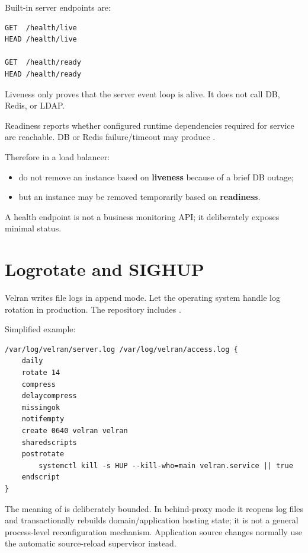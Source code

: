 Built-in server endpoints are:

\begin{lstlisting}
GET  /health/live
HEAD /health/live

GET  /health/ready
HEAD /health/ready
\end{lstlisting}

Liveness only proves that the server event loop is alive. It does not call DB, Redis, or LDAP.

Readiness reports whether configured runtime dependencies required for service are reachable. DB or Redis failure/timeout may produce .

Therefore in a load balancer:

\begin{itemize}
  \item do not remove an instance based on \textbf{liveness} because of a brief DB outage;
  \item but an instance may be removed temporarily based on \textbf{readiness}.
\end{itemize}

A health endpoint is not a business monitoring API; it deliberately exposes minimal status.

\Needspace{0.46\textheight}
\section{Logrotate and SIGHUP}

Velran writes file logs in append mode. Let the operating system handle log rotation in production. The repository includes .

Simplified example:

\begin{lstlisting}
/var/log/velran/server.log /var/log/velran/access.log {
    daily
    rotate 14
    compress
    delaycompress
    missingok
    notifempty
    create 0640 velran velran
    sharedscripts
    postrotate
        systemctl kill -s HUP --kill-who=main velran.service || true
    endscript
}
\end{lstlisting}

The meaning of  is deliberately bounded. In behind-proxy mode it reopens log files and transactionally rebuilds domain/application hosting state; it is not a general process-level  reconfiguration mechanism. Application source changes normally use the automatic source-reload supervisor instead.

